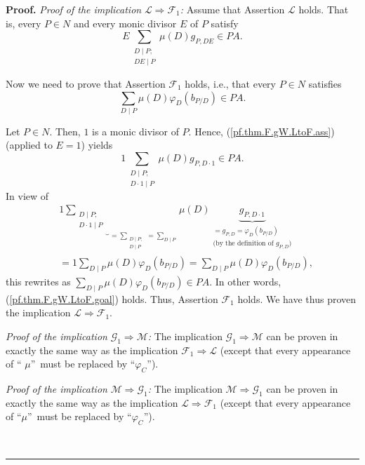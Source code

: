 \documentclass[numbers=enddot,12pt,final,onecolumn,notitlepage]{scrartcl}%
\theoremstyle{definition}
\newenvironment{proof}[1][Proof]{\noindent\textbf{#1.} }{\ \rule{0.5em}{0.5em}}
\let\sumnonlimits\sum
\renewcommand{\sum}{\sumnonlimits\limits}
\begin{document}
\begin{proof}
\textit{Proof of the implication }$\mathcal{L}\Longrightarrow\mathcal{F}_{1}%
$\textit{:} Assume that Assertion $\mathcal{L}$ holds. That is, every $P\in N$
and every monic divisor $E$ of $P$ satisfy%
\begin{equation}
E\sum_{\substack{D\mid P;\\DE\mid P}}\mu\left(  D\right)  g_{P,DE}\in PA.
\label{pf.thm.F.gW.LtoF.ass}%
\end{equation}


Now we need to prove that Assertion $\mathcal{F}_{1}$ holds, i.e., that every
$P\in N$ satisfies%
\begin{equation}
\sum_{D\mid P}\mu\left(  D\right)  \varphi_{D}\left(  b_{P/D}\right)  \in PA.
\label{pf.thm.F.gW.LtoF.goal}%
\end{equation}


Let $P\in N$. Then, $1$ is a monic divisor of $P$. Hence,
(\ref{pf.thm.F.gW.LtoF.ass}) (applied to $E=1$) yields%
\[
1\sum_{\substack{D\mid P;\\D\cdot1\mid P}}\mu\left(  D\right)  g_{P,D\cdot
1}\in PA.
\]
In view of%
\begin{align*}
&  1\underbrace{\sum_{\substack{D\mid P;\\D\cdot1\mid P}}}_{=\sum
_{\substack{D\mid P;\\D\mid P}}=\sum_{D\mid P}}\mu\left(  D\right)
\underbrace{g_{P,D\cdot1}}_{\substack{=g_{P,D}=\varphi_{D}\left(
b_{P/D}\right)  \\\text{(by the definition of }g_{P,D}\text{)}}}\\
&  =1\sum_{D\mid P}\mu\left(  D\right)  \varphi_{D}\left(  b_{P/D}\right)
=\sum_{D\mid P}\mu\left(  D\right)  \varphi_{D}\left(  b_{P/D}\right)  ,
\end{align*}
this rewrites as $\sum_{D\mid P}\mu\left(  D\right)  \varphi_{D}\left(
b_{P/D}\right)  \in PA$. In other words, (\ref{pf.thm.F.gW.LtoF.goal}) holds.
Thus, Assertion $\mathcal{F}_{1}$ holds. We have thus proven the implication
$\mathcal{L}\Longrightarrow\mathcal{F}_{1}$.

\textit{Proof of the implication }$\mathcal{G}_{1}\Longrightarrow\mathcal{M}%
$\textit{:} The implication $\mathcal{G}_{1}\Longrightarrow\mathcal{M}$ can be
proven in exactly the same way as the implication $\mathcal{F}_{1}%
\Longrightarrow\mathcal{L}$ (except that every appearance of \textquotedblleft%
$\mu$\textquotedblright\ must be replaced by \textquotedblleft$\varphi_{C}%
$\textquotedblright).

\textit{Proof of the implication }$\mathcal{M}\Longrightarrow\mathcal{G}_{1}%
$\textit{:} The implication $\mathcal{M}\Longrightarrow\mathcal{G}_{1}$ can be
proven in exactly the same way as the implication $\mathcal{L}\Longrightarrow
\mathcal{F}_{1}$ (except that every appearance of \textquotedblleft$\mu
$\textquotedblright\ must be replaced by \textquotedblleft$\varphi_{C}%
$\textquotedblright).


\end{proof}
\end{document}
